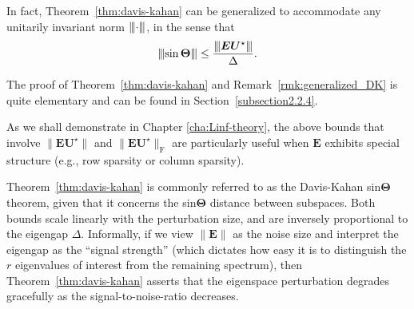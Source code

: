 \begin{remark}\label{rmk:generalized_DK}
In fact, Theorem~\ref{thm:davis-kahan} can be generalized to accommodate any unitarily invariant norm ${\left\vert\kern-0.25ex\left\vert\kern-0.25ex\left\vert \cdot \right\vert\kern-0.25ex\right\vert\kern-0.25ex\right\vert}$, in the sense that
%
\begin{align}
{\left\vert\kern-0.25ex\left\vert\kern-0.25ex\left\vert \sin\bm{\Theta} \right\vert\kern-0.25ex\right\vert\kern-0.25ex\right\vert}
\leq\frac{{\left\vert\kern-0.25ex\left\vert\kern-0.25ex\left\vert \bm{E}\bm{U}^{\star} \right\vert\kern-0.25ex\right\vert\kern-0.25ex\right\vert}}{\Delta }.
\end{align}

\end{remark}

The proof of Theorem~\ref{thm:davis-kahan} and Remark~\ref{rmk:generalized_DK} is quite elementary and can be found in Section~\ref{subsection2.2.4}. 



%
\begin{remark}
As we shall demonstrate in Chapter \ref{cha:Linf-theory}, the above bounds that involve $\|\bm{E}\bm{U}^{\star}\|$ and $\|\bm{E}\bm{U}^{\star}\|_{\mathrm{F}}$ are particularly useful when $\bm{E}$ exhibits special structure (e.g., row sparsity or column sparsity).
\end{remark}
%
Theorem~\ref{thm:davis-kahan} is commonly referred to as the Davis-Kahan sin$\bm{\Theta}$ theorem, given that it concerns the sin${\bm\Theta}$ distance between subspaces.
Both bounds scale linearly with the perturbation size, and are inversely proportional to the eigengap $\Delta$. Informally, if we view $\|\bm{E}\|$ as the noise size and interpret the eigengap as the ``signal strength'' (which dictates how easy it is to distinguish the $r$ eigenvalues of interest from the remaining spectrum), then Theorem~\ref{thm:davis-kahan}
asserts that the eigenspace perturbation degrades gracefully as the signal-to-noise-ratio decreases.






